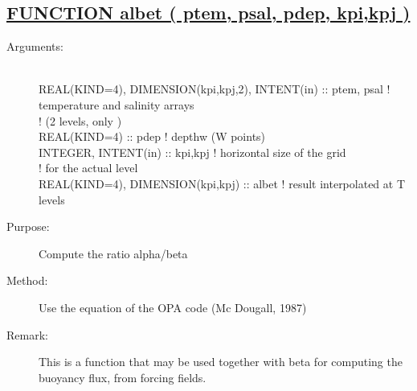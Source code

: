 \documentclass[a4paper,11pt]{article}
\begin{document}
\newpage

\subsection*{\underline{FUNCTION albet ( ptem, psal, pdep, kpi,kpj )}}
\begin{description}
\item[Arguments:] \ \\
       REAL(KIND=4), DIMENSION(kpi,kpj,2), INTENT(in) :: ptem, psal ! temperature and salinity arrays \\
                                                                    ! (2 levels, only ) \\
       REAL(KIND=4)                                   :: pdep       ! depthw (W points) \\
       INTEGER, INTENT(in)    :: kpi,kpj                            ! horizontal size of the grid \\
                                                                    ! for the actual level \\
       REAL(KIND=4), DIMENSION(kpi,kpj) :: albet                   ! result  interpolated at T levels

\item[Purpose:]  Compute the ratio alpha/beta
\item[Method:] Use the equation of the OPA code (Mc Dougall, 1987)
\item[Remark:] This is a function that may be used together with beta for computing the buoyancy flux, from forcing fields.
\end{description}
\end{document}

